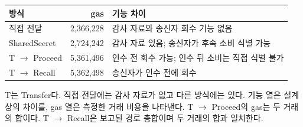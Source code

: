 \begin{center}
\begin{minipage}{\columnwidth}
\centering\small\captionsetup{hypcap=false}
\label{tab:eval-transfer}
\begin{tabularx}{\columnwidth}{@{}p{20mm}rY@{}}
\toprule
방식 & gas & 기능 차이 \\ \midrule
직접 전달 & 2,366,228 & 감사 자료와 송신자 회수 기능 없음 \\
SharedSecret & 2,724,242 & 감사 자료 있음; 송신자가 후속 소비 식별 가능 \\
T $\to$ Proceed & 5,361,496 & 인수 전 회수 가능; 인수 뒤 소비는 직접 식별 불가 \\
T $\to$ Recall & 5,362,498 & 송신자가 인수 전에 회수 \\
\bottomrule
\end{tabularx}
\par\smallskip\begin{minipage}{\columnwidth}\footnotesize
T는 Transfer다. 직접 전달에는 감사 자료가 없고 다른 방식에는 있다.
기능 열은 설계상의 차이를, gas 열은 측정한 거래 비용을 나타낸다.
T $\to$ Proceed의 gas는 두 거래의 합이다. T $\to$ Recall은
보고된 경로 총합이며 두 거래의 합과 일치한다.
\end{minipage}
\end{minipage}
\end{center}
